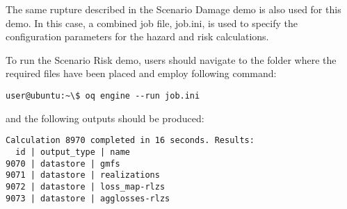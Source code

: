 The same rupture described in the Scenario Damage demo is also used for this
demo. In this case, a combined job file, job.ini, is used to specify the
configuration parameters for the hazard and risk calculations.

To run the Scenario Risk demo, users should navigate to the folder where the
required files have been placed and employ following command:

\begin{verbatim}
user@ubuntu:~\$ oq engine --run job.ini
\end{verbatim}

and the following outputs should be produced:

\begin{verbatim}
Calculation 8970 completed in 16 seconds. Results:
  id | output_type | name
9070 | datastore | gmfs
9071 | datastore | realizations
9072 | datastore | loss_map-rlzs
9073 | datastore | agglosses-rlzs
\end{verbatim}
